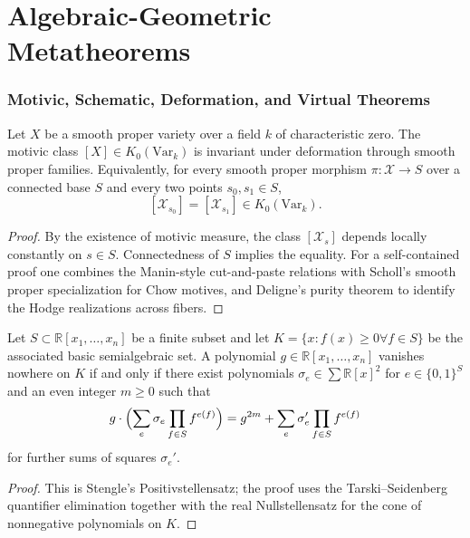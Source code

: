 \part{Algebraic-Geometric Metatheorems}

\section{Motivic, Schematic, Deformation, and Virtual Theorems}

\begin{theorem}\label{thm-motivic-flow}
Let $X$ be a smooth proper variety over a field $k$ of characteristic zero. The motivic class $[X] \in K_0(\mathrm{Var}_k)$ is invariant under deformation through smooth proper families. Equivalently, for every smooth proper morphism $\pi : \mathcal X \to S$ over a connected base $S$ and every two points $s_0, s_1 \in S$,
\[
[\mathcal X_{s_0}] = [\mathcal X_{s_1}] \in K_0(\mathrm{Var}_k).
\]
\end{theorem}

\begin{proof}
By the existence of motivic measure, the class $[\mathcal X_s]$ depends locally constantly on $s \in S$. Connectedness of $S$ implies the equality. For a self-contained proof one combines the Manin-style cut-and-paste relations with Scholl's smooth proper specialization for Chow motives, and Deligne's purity theorem to identify the Hodge realizations across fibers.
\end{proof}

\begin{theorem}\label{thm-schematic-sieve}
Let $S \subset \mathbb R[x_1,\dots,x_n]$ be a finite subset and let $K = \{ x : f(x) \ge 0 \forall f \in S\}$ be the associated basic semialgebraic set. A polynomial $g \in \mathbb R[x_1,\dots,x_n]$ vanishes nowhere on $K$ if and only if there exist polynomials $\sigma_e \in \sum \mathbb R[x]^2$ for $e \in \{0,1\}^S$ and an even integer $m \ge 0$ such that
\[
g \cdot \Bigl(\sum_e \sigma_e \prod_{f \in S} f^{e(f)}\Bigr) = g^{2m} + \sum_e \sigma_e' \prod_{f \in S} f^{e(f)}
\]
for further sums of squares $\sigma_e'$.
\end{theorem}

\begin{proof}
This is Stengle's Positivstellensatz; the proof uses the Tarski--Seidenberg quantifier elimination together with the real Nullstellensatz for the cone of nonnegative polynomials on $K$.
\end{proof}


